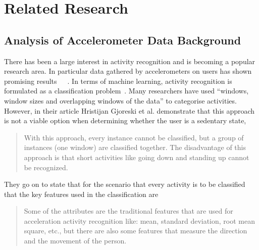 \chapter{Related Research} %
\label{cha:chapter_rr}
\section{Analysis of Accelerometer Data Background}
\label{sec:accanalback}

There has been a large interest in activity recognition and is becoming a popular research area. In particular data gathered by accelerometers on users has shown promising results~\cite{bao2004annotated}~\cite{ravi2005recognition}~\cite{randell2000awerness}. In terms of machine learning, activity recognition is formulated as a classification problem~\cite{ravi2005recognition}. Many researchers have used ``windows, window sizes and overlapping windows of the data''\cite{ravi2005recognition} to categorise activities. However, in their article Hristijan Gjoreski et al. demonstrate that this approach is not a viable option when determining whether the user is a sedentary state, 
\begin{quote}
With this approach, every instance cannot be classified, but a group of instances (one window) are classified together. The disadvantage of this approach is that short activities like going down and standing up cannot be recognized.
\end{quote}
They go on to state that for the scenario that every activity is to be classified that the key features used in the classification are
\begin{quote}
Some of the attributes are the traditional features that are used for acceleration activity recognition like: mean, standard deviation, root mean square, etc., but there are also some features that measure the direction and the movement of the person.
\end{quote}